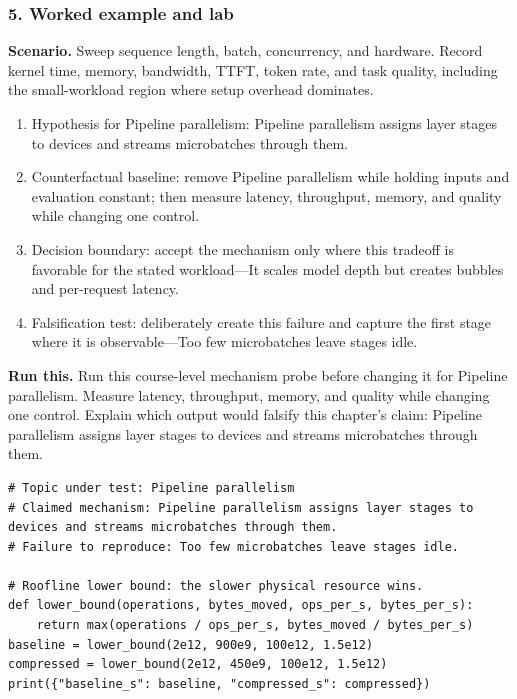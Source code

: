 \subsubsection*{5. Worked example and lab}
\textbf{Scenario.} Sweep sequence length, batch, concurrency, and hardware. Record kernel time, memory, bandwidth, TTFT, token rate, and task quality, including the small-workload region where setup overhead dominates.
\begin{enumerate}
\item Hypothesis for Pipeline parallelism: Pipeline parallelism assigns layer stages to devices and streams microbatches through them.
\item Counterfactual baseline: remove Pipeline parallelism while holding inputs and evaluation constant; then measure latency, throughput, memory, and quality while changing one control.
\item Decision boundary: accept the mechanism only where this tradeoff is favorable for the stated workload—It scales model depth but creates bubbles and per-request latency.
\item Falsification test: deliberately create this failure and capture the first stage where it is observable—Too few microbatches leave stages idle.
\end{enumerate}
\textbf{Run this.} Run this course-level mechanism probe before changing it for Pipeline parallelism. Measure latency, throughput, memory, and quality while changing one control. Explain which output would falsify this chapter's claim: Pipeline parallelism assigns layer stages to devices and streams microbatches through them.
\begin{Verbatim}[fontsize=\scriptsize]
# Topic under test: Pipeline parallelism
# Claimed mechanism: Pipeline parallelism assigns layer stages to devices and streams microbatches through them.
# Failure to reproduce: Too few microbatches leave stages idle.

# Roofline lower bound: the slower physical resource wins.
def lower_bound(operations, bytes_moved, ops_per_s, bytes_per_s):
    return max(operations / ops_per_s, bytes_moved / bytes_per_s)
baseline = lower_bound(2e12, 900e9, 100e12, 1.5e12)
compressed = lower_bound(2e12, 450e9, 100e12, 1.5e12)
print({"baseline_s": baseline, "compressed_s": compressed})
\end{Verbatim}
